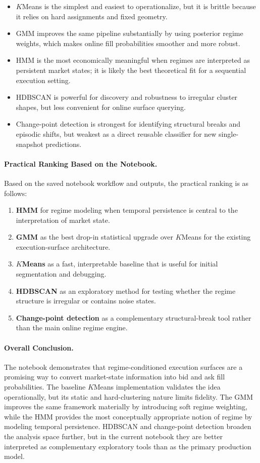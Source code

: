 \documentclass[12pt,a4paper]{report}
\begin{document}
\begin{itemize}
	\item $K$Means is the simplest and easiest to operationalize, but it is brittle because it relies on hard assignments and fixed geometry.
	\item GMM improves the same pipeline substantially by using posterior regime weights, which makes online fill probabilities smoother and more robust.
	\item HMM is the most economically meaningful when regimes are interpreted as persistent market states; it is likely the best theoretical fit for a sequential execution setting.
	\item HDBSCAN is powerful for discovery and robustness to irregular cluster shapes, but less convenient for online surface querying.
	\item Change-point detection is strongest for identifying structural breaks and episodic shifts, but weakest as a direct reusable classifier for new single-snapshot predictions.
\end{itemize}

\paragraph{Practical Ranking Based on the Notebook.}
Based on the saved notebook workflow and outputs, the practical ranking is as follows:

\begin{enumerate}
	\item \textbf{HMM} for regime modeling when temporal persistence is central to the interpretation of market state.
	\item \textbf{GMM} as the best drop-in statistical upgrade over $K$Means for the existing execution-surface architecture.
	\item \textbf{$K$Means} as a fast, interpretable baseline that is useful for initial segmentation and debugging.
	\item \textbf{HDBSCAN} as an exploratory method for testing whether the regime structure is irregular or contains noise states.
	\item \textbf{Change-point detection} as a complementary structural-break tool rather than the main online regime engine.
\end{enumerate}

\paragraph{Overall Conclusion.}
The notebook demonstrates that regime-conditioned execution surfaces are a promising way to convert market-state information into bid and ask fill probabilities. The baseline $K$Means implementation validates the idea operationally, but its static and hard-clustering nature limits fidelity. The GMM improves the same framework materially by introducing soft regime weighting, while the HMM provides the most conceptually appropriate notion of regime by modeling temporal persistence. HDBSCAN and change-point detection broaden the analysis space further, but in the current notebook they are better interpreted as complementary exploratory tools than as the primary production model.
\end{document}
